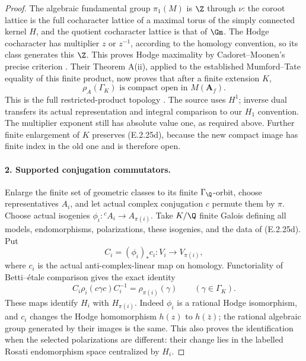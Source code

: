 \begin{proof}
The algebraic fundamental group \(\pi_1(M)\) is
\(\Z\) through \(\nu\): the coroot lattice is the
full cocharacter lattice of a maximal torus of the
simply connected kernel \(H\), and the quotient
cocharacter lattice is that of \(\Gm\). The Hodge
cocharacter has multiplier \(z\) or \(z^{-1}\),
according to the homology convention, so its class
generates this \(\Z\). This proves Hodge maximality
by Cadoret--Moonen's precise criterion
\cite[Sections 2.2--2.3, author p.~4]
{GenCadoretMoonen2020}. Their Theorem A(ii), applied
to the established Mumford--Tate equality of this
finite product, now proves that after a finite
extension \(K\),
\[
 \rho_A(\Gamma_K)\text{ is compact open in }M(\mathbf A_f).
 \tag{E.2.25d}
\]
This is the full restricted-product topology
\cite[Theorem A(ii), author p.~2; Theorem 5.3 and
proof, author pp.~11--12]{GenCadoretMoonen2020}.
The source uses \(H^1\); inverse dual transfers its
actual representation and integral comparison to our
\(H_1\) convention. The multiplier exponent still has
absolute value one, as required above. Further finite
enlargement of \(K\) preserves (E.2.25d), because the
new compact image has finite index in the old one and
is therefore open.

\paragraph{2. Supported conjugation commutators.}
Enlarge the finite set of geometric classes to its
finite \(\Gamma_\Q\)-orbit, choose representatives
\(A_i\), and let actual complex conjugation \(c\)
permute them by \(\pi\). Choose actual isogenies
\(\phi_i:{}^c A_i\to A_{\pi(i)}\). Take \(K/\Q\)
finite Galois defining all models, endomorphisms,
polarizations, these isogenies, and the data of
(E.2.25d). Put
\[
 C_i=(\phi_i)_*c_i:V_i\longrightarrow V_{\pi(i)},
\]
where \(c_i\) is the actual anti-complex-linear
map on homology. Functoriality of Betti--\'etale
comparison gives the exact identity
\[
 C_i\rho_i(c\gamma c)C_i^{-1}
          =\rho_{\pi(i)}(\gamma)
                  \qquad(\gamma\in\Gamma_K).
 \tag{E.2.25e}
\]
These maps identify \(H_i\) with \(H_{\pi(i)}\).
Indeed \(\phi_i\) is a rational Hodge isomorphism,
and \(c_i\) changes the Hodge homomorphism \(h(z)\)
to \(h(\bar z)\); the rational algebraic group
generated by their images is the same. This also
proves the identification when the selected
polarizations are different: their change lies in
the labelled Rosati endomorphism space centralized
by \(H_i\).


\end{proof}
